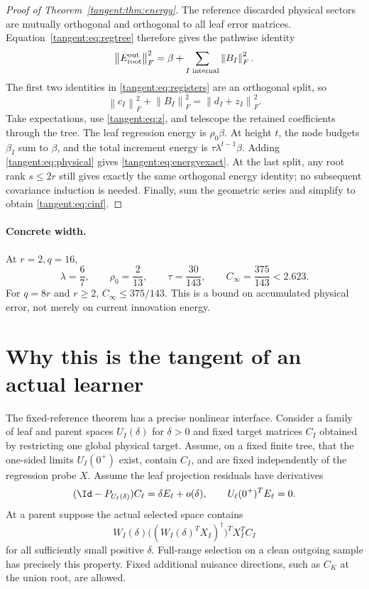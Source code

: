 \documentclass[11pt,oneside,openany,a4paper]{book}
\numberwithin{equation}{chapter}
\theoremstyle{definition}
\theoremstyle{remark}
\newcommand{\F}[1]{\left\lVert#1\right\rVert_F}
\begin{document}
\begin{proof}[Proof of Theorem~\ref{tangent:thm:energy}]
The reference discarded physical sectors are mutually orthogonal and orthogonal to all leaf error matrices. Equation~\eqref{tangent:eq:regtree} therefore gives the pathwise identity
\begin{equation}\label{tangent:eq:physical}
 \F{E_{\rm root}^{\rm out}}^2=\beta+\sum_{I\text{ internal}}\F{B_I}^2.
\end{equation}
The first two identities in \eqref{tangent:eq:registers} are an orthogonal split, so
\[
 \F{c_I}^2+\F{B_I}^2=\F{d_I+z_I}^2.
\]
Take expectations, use \eqref{tangent:eq:z}, and telescope the retained coefficients through the tree. The leaf regression energy is $\rho_0\beta$. At height $t$, the node budgets $\beta_I$ sum to $\beta$, and the total increment energy is $\tau\lambda^{t-1}\beta$. Adding \eqref{tangent:eq:physical} gives \eqref{tangent:eq:energyexact}. At the last split, any root rank $s\le2r$ still gives exactly the same orthogonal energy identity; no subsequent covariance induction is needed. Finally, sum the geometric series and simplify to obtain \eqref{tangent:eq:cinf}.
\end{proof}

\paragraph{Concrete width.}
At $r=2,q=16$,
\begin{equation}\label{tangent:eq:values}
 \lambda=\frac67,\qquad\rho_0=\frac2{13},\qquad\tau=\frac{30}{143},
 \qquad C_\infty=\frac{375}{143}<2.623.
\end{equation}
For $q=8r$ and $r\ge2$, $C_\infty\le375/143$. This is a bound on accumulated physical error, not merely on current innovation energy.

\section{Why this is the tangent of an actual learner}\label{tangent:sec:tangent}
The fixed-reference theorem has a precise nonlinear interface. Consider a family of leaf and parent spaces $U_I(\delta)$ for $\delta>0$ and fixed target matrices $C_I$ obtained by restricting one global physical target. Assume, on a fixed finite tree, that the one-sided limits $U_I(0^+)$ exist, contain $C_I$, and are fixed independently of the regression probe $X$. Assume the leaf projection residuals have derivatives
\[
 (\Id-P_{U_\ell(\delta)})C_\ell=\delta E_\ell+o(\delta),
 \qquad U_\ell(0^+)^TE_\ell=0.
\]
At a parent suppose the actual selected space contains
\begin{equation}\label{tangent:eq:containfit}
 W_I(\delta)\bigl((W_I(\delta)^TX_I)^\dagger\bigr)^TX_I^TC_I
\end{equation}
for all sufficiently small positive $\delta$. Full-range selection on a clean outgoing sample has precisely this property. Fixed additional nuisance directions, such as $C_K$ at the union root, are allowed.
\end{document}
